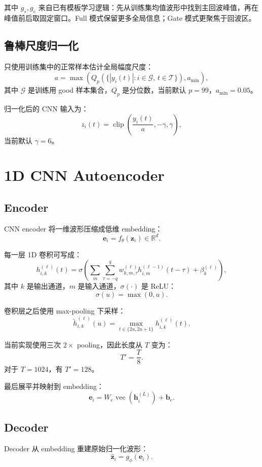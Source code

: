 \documentclass[UTF8,fontset=fandol]{ctexart}
\begin{document}
其中 $g_s,g_e$ 来自已有模板学习逻辑：先从训练集均值波形中找到主回波峰值，再在峰值前后取固定窗口。Full 模式保留更多全局信息；Gate 模式更聚焦于回波区。

\subsection{鲁棒尺度归一化}

只使用训练集中的正常样本估计全局幅度尺度：
\[
  a =
  \max\left(
    Q_p\left(\{|y_i(t)|: i \in \mathcal{G},\, t \in \mathcal{T}\}\right),
    a_{\min}
  \right),
\]
其中 $\mathcal{G}$ 是训练用 good 样本集合，$Q_p$ 是分位数，当前默认 $p=99$，$a_{\min}=0.05$。

归一化后的 CNN 输入为：
\[
  z_i(t)
  =
  \operatorname{clip}
  \left(
    \frac{y_i(t)}{a},
    -\gamma,
    \gamma
  \right),
\]
当前默认 $\gamma=6$。

\section{1D CNN Autoencoder}

\subsection{Encoder}

CNN encoder 将一维波形压缩成低维 embedding：
\[
  \bm{e}_i = f_\theta(\bm{z}_i) \in \mathbb{R}^{d}.
\]

每一层 1D 卷积可写成：
\[
  h^{(\ell)}_{i,k}(t)
  =
  \sigma
  \left(
    \sum_{m}
    \sum_{\tau=-q}^{q}
    w^{(\ell)}_{k,m,\tau}
    h^{(\ell-1)}_{i,m}(t-\tau)
    +
    \beta^{(\ell)}_k
  \right),
\]
其中 $k$ 是输出通道，$m$ 是输入通道，$\sigma(\cdot)$ 是 ReLU：
\[
  \sigma(u) = \max(0,u).
\]

卷积层之后使用 max-pooling 下采样：
\[
  \tilde{h}^{(\ell)}_{i,k}(u)
  =
  \max_{t \in \{2u,2u+1\}}
  h^{(\ell)}_{i,k}(t).
\]

当前实现使用三次 $2\times$ pooling，因此长度从 $T$ 变为：
\[
  T' = \frac{T}{8}.
\]
对于 $T=1024$，有 $T'=128$。

最后展平并映射到 embedding：
\[
  \bm{e}_i
  =
  W_e \operatorname{vec}(\bm{h}_i^{(L)}) + \bm{b}_e.
\]

\subsection{Decoder}

Decoder 从 embedding 重建原始归一化波形：
\[
  \hat{\bm{z}}_i = g_\phi(\bm{e}_i).
\]
\end{document}

